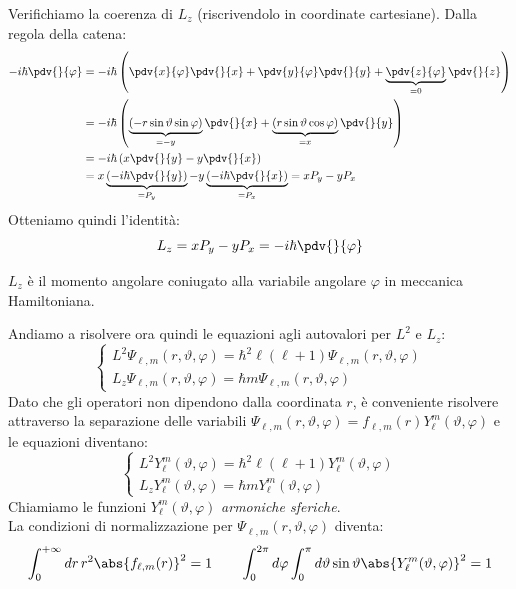 Verifichiamo la coerenza di \( L_z \) (riscrivendolo in coordinate cartesiane).
Dalla regola della catena:
\begin{align*}
    -i\hbar \pdv{}{\varphi} &= -i\hbar \left( \pdv{x}{\varphi}\pdv{}{x} + \pdv{y}{\varphi}\pdv{}{y} + \underbrace{\pdv{z}{\varphi}}_{=0}\pdv{}{z} \right) \\
    &= -i\hbar \left( \underbrace{(-r\sin\vartheta\sin\varphi)}_{=-y} \pdv{}{x} + \underbrace{(r\sin\vartheta\cos\varphi)}_{=x} \pdv{}{y} \right) \\
    &= -i\hbar \left( x\pdv{}{y} - y\pdv{}{x} \right) \\
    &= x\underbrace{\left(-i\hbar\pdv{}{y}\right)}_{=P_y} - y\underbrace{\left(-i\hbar\pdv{}{x}\right)}_{=P_x} = x P_y - y P_x
\end{align*}
Otteniamo quindi l'identità:
\begin{equation}
    L_z = x P_y - y P_x = -i\hbar \pdv{}{\varphi}
\end{equation}

\begin{remark}
    \( L_z \) è il momento angolare coniugato alla variabile angolare \( \varphi \) in meccanica Hamiltoniana.
\end{remark}

Andiamo a risolvere ora quindi le equazioni agli autovalori per \(L^2\) e \(L_z\):
\begin{equation}
    \begin{cases}
        L^2 \Psi_{\ell,m}(r, \vartheta, \varphi) = \hbar^2 \ell(\ell+1) \Psi_{\ell,m}(r, \vartheta, \varphi) \\
        L_z \Psi_{\ell,m}(r, \vartheta, \varphi) = \hbar m \Psi_{\ell,m}(r, \vartheta, \varphi)
    \end{cases}
\end{equation}
Dato che gli operatori non dipendono dalla coordinata \(r\), 
è conveniente risolvere attraverso la separazione delle variabili \(\Psi_{\ell,m}(r, \vartheta, \varphi)= f_{\ell,m}(r)Y^m_\ell(\vartheta,\varphi)\) e le equazioni diventano:
\[
    \begin{cases}
        L^2 Y^m_\ell(\vartheta,\varphi) = \hbar^2 \ell(\ell+1) Y^m_\ell(\vartheta,\varphi) \\
        L_z Y^m_\ell(\vartheta,\varphi) = \hbar m Y^m_\ell(\vartheta,\varphi)
    \end{cases}
\]
Chiamiamo le funzioni \(Y^m_\ell(\vartheta,\varphi)\) \textit{armoniche sferiche}.\\
La condizioni di normalizzazione per \(\Psi_{\ell,m}(r, \vartheta, \varphi)\) diventa:
\[
    \int_{0}^{+\infty} dr\, r^2 \abs{f_{\ell,m}(r)}^2 = 1  \qquad
    \int_{0}^{2\pi} d\varphi \int_{0}^{\pi} d\vartheta \sin\vartheta \abs{Y_\ell^m(\vartheta, \varphi)}^2 = 1
\]

